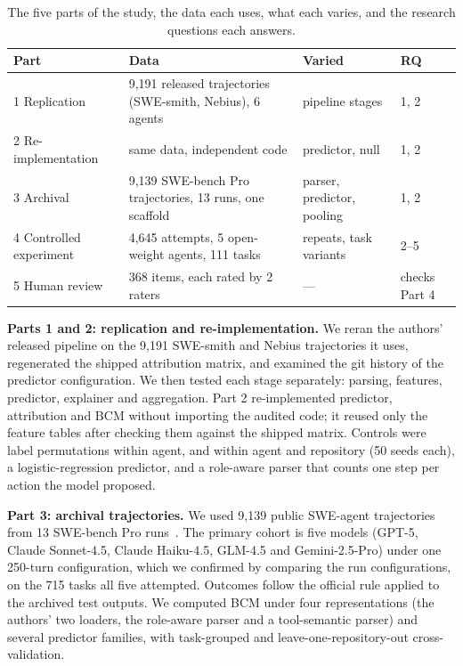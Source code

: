 \documentclass[conference]{IEEEtran}
\newcommand{\bcm}{\textsc{BCM}}
\begin{document}
\begin{table}[t]
\centering
\caption{The five parts of the study, the data each uses, what each varies, and the research questions each answers.}
\label{tab:design}
\begin{tabular}{llll}
\toprule
Part & Data & Varied & RQ\\
\midrule
1 Replication & 9{,}191 released trajectories (SWE-smith, Nebius), 6 agents & pipeline stages & 1, 2\\
2 Re-implementation & same data, independent code & predictor, null & 1, 2\\
3 Archival & 9{,}139 SWE-bench Pro trajectories, 13 runs, one scaffold & parser, predictor, pooling & 1, 2\\
4 Controlled experiment & 4{,}645 attempts, 5 open-weight agents, 111 tasks & repeats, task variants & 2--5\\
5 Human review & 368 items, each rated by 2 raters & --- & checks Part 4\\
\bottomrule
\end{tabular}
\end{table}

\textbf{Parts 1 and 2: replication and re-implementation.} We reran the authors' released pipeline on the 9{,}191 SWE-smith and Nebius trajectories it uses, regenerated the shipped attribution matrix, and examined the git history of the predictor configuration. We then tested each stage separately: parsing, features, predictor, explainer and aggregation. Part 2 re-implemented predictor, attribution and \bcm{} without importing the audited code; it reused only the feature tables after checking them against the shipped matrix. Controls were label permutations within agent, and within agent and repository (50 seeds each), a logistic-regression predictor, and a role-aware parser that counts one step per action the model proposed.

\textbf{Part 3: archival trajectories.} We used 9{,}139 public SWE-agent trajectories from 13 SWE-bench Pro runs~\cite{deng2025swebenchpro}. The primary cohort is five models (GPT-5, Claude Sonnet-4.5, Claude Haiku-4.5, GLM-4.5 and Gemini-2.5-Pro) under one 250-turn configuration, which we confirmed by comparing the run configurations, on the 715 tasks all five attempted. Outcomes follow the official rule applied to the archived test outputs. We computed \bcm{} under four representations (the authors' two loaders, the role-aware parser and a tool-semantic parser) and several predictor families, with task-grouped and leave-one-repository-out cross-validation.
\end{document}

